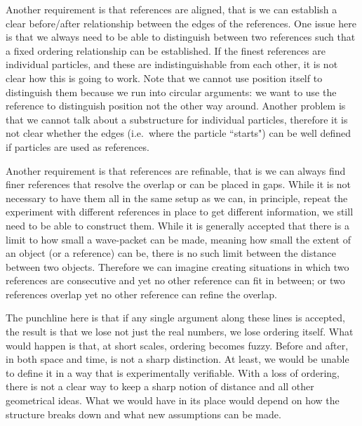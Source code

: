 \documentclass{article}
\begin{document}
Another requirement is that references are aligned, that is we can establish a clear before/after relationship between the edges of the references. One issue here is that we always need to be able to distinguish between two references such that a fixed ordering relationship can be established. If the finest references are individual particles, and these are indistinguishable from each other, it is not clear how this is going to work. Note that we cannot use position itself to distinguish them because we run into circular arguments: we want to use the reference to distinguish position not the other way around. Another problem is that we cannot talk about a substructure for individual particles, therefore it is not clear whether the edges (i.e.~where the particle ``starts") can be well defined if particles are used as references.

Another requirement is that references are refinable, that is we can always find finer references that resolve the overlap or can be placed in gaps. While it is not necessary to have them all in the same setup as we can, in principle, repeat the experiment with different references in place to get different information, we still need to be able to construct them. While it is generally accepted that there is a limit to how small a wave-packet can be made, meaning how small the extent of an object (or a reference) can be, there is no such limit between the distance between two objects. Therefore we can imagine creating situations in which two references are consecutive and yet no other reference can fit in between; or two references overlap yet no other reference can refine the overlap.

The punchline here is that if any single argument along these lines is accepted, the result is that we lose not just the real numbers, we lose ordering itself. What would happen is that, at short scales, ordering becomes fuzzy. Before and after, in both space and time, is not a sharp distinction. At least, we would be unable to define it in a way that is experimentally verifiable. With a loss of ordering, there is not a clear way to keep a sharp notion of distance and all other geometrical ideas. What we would have in its place would depend on how the structure breaks down and what new assumptions can be made.





\end{document}
